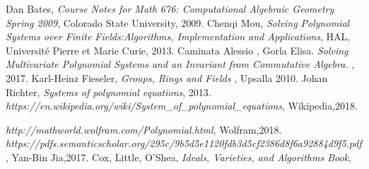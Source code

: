 \documentclass[11pt]{article}
\begin{document}
\begin{thebibliography}{1}
  Dan Bates,
  \textit{Course Notes for Math 676: Computational Algebraic Geometry Spring 2009},
   Colorado State University,
   2009.
  Chenqi Mou,
  \textit{Solving Polynomial Systems over Finite Fields:Algorithms, Implementation and Applications},
   HAL,
   Université Pierre et Marie Curie,
   2013.
  Caminata Alessio , Gorla Elisa.
  \textit{Solving Multivariate Polynomial Systems and an Invariant from Commutative Algebra. },
   2017.
  Karl-Heinz Fieseler,
  \textit{Groups, Rings and Fields },
   Upsalla
   2010.
  Johan Richter,
  \textit{Systems of polynomial equations},
   2013.
  \textit{ https://en.wikipedia.org/wiki/System\_of\_polynomial\_equations},
   Wikipedia,2018.

  \textit{ http://mathworld.wolfram.com/Polynomial.html},
   Wolfram,2018.
  \textit{ https://pdfs.semanticscholar.org/295c/9b5d5e1120fdb3d5cf2386d8f6a92884d9f5.pdf},
   Yan-Bin Jia,2017.
   Cox, Little, O'Shea,
   \textit{Ideals, Varieties, and Algorithms Book},
\end{thebibliography}
\end{document}
